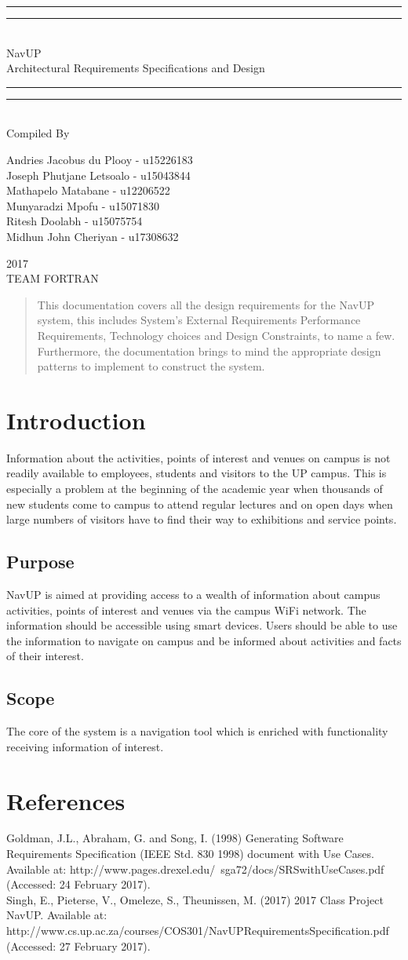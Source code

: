 \documentclass{article}
\newcommand*{\titleGP}{\begingroup
\centering 
\vspace*{\baselineskip}

\rule{\textwidth}{1.6pt}\vspace*{-\baselineskip}\vspace*{2pt}
\rule{\textwidth}{0.4pt}\\[\baselineskip]

{\LARGE NavUP\\ [0.3\baselineskip] Architectural Requirements Specifications and Design } \\ [0.2\baselineskip]
\rule{\textwidth}{0.4pt}\vspace*{-\baselineskip}\vspace{3.2pt}
\rule{\textwidth}{1.6pt}\\[\baselineskip] %



Compiled By \\[\baselineskip]
{\Large Andries Jacobus du Plooy - u15226183 \\ Joseph Phutjane Letsoalo - u15043844 \\ Mathapelo Matabane - u12206522 \\ Munyaradzi Mpofu - u15071830\\ Ritesh Doolabh - u15075754 \\ Midhun John Cheriyan - u17308632\par} 
 

\vfill

{\scshape 2017} \\[0.3\baselineskip]
{\large TEAM FORTRAN}\par

\endgroup}
\begin{document}
\titleGP
\newpage


\begin{abstract}
\noindent This documentation covers all the design requirements for the NavUP system, this includes System's External Requirements Performance Requirements, Technology choices and Design Constraints, to name a few. Furthermore, the documentation brings to mind the appropriate design patterns to implement to construct the system.
\end{abstract}

\newpage
\tableofcontents

\newpage
\section{Introduction}
Information about the activities, points of interest and venues on campus is not
readily available to employees, students and visitors to the UP campus. This is
especially a problem at the beginning of the academic year when thousands of new
students come to campus to attend regular lectures and on open days when large
numbers of visitors have to find their way to exhibitions and service points.

\subsection{Purpose}
NavUP is aimed at providing access to a wealth of information about campus
activities, points of interest and venues via the campus WiFi network. The information
should be accessible using smart devices. Users should be able to use the
information to navigate on campus and be informed about activities and facts of their
interest.
\subsection{Scope}
The core of the system is a navigation tool which is enriched with functionality
receiving information of interest.

\section{References}
Goldman, J.L., Abraham, G. and Song, I. (1998) Generating Software Requirements Specification (IEEE Std. 830 1998) document with Use Cases. Available at: http://www.pages.drexel.edu/~sga72/docs/SRSwithUseCases.pdf (Accessed: 24 February 2017).\\
\noindent Singh, E., Pieterse, V., Omeleze, S., Theunissen, M. (2017) 2017 Class Project NavUP. Available at: http://www.cs.up.ac.za/courses/COS301/NavUPRequirementsSpecification.pdf (Accessed: 27 February 2017).\\ 
\newpage
\end{document}
